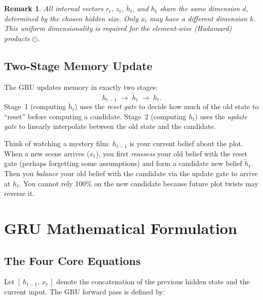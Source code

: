 \documentclass[12pt,a4paper]{article}
\newtheorem{remark}{Remark}[section]
\begin{document}
\begin{remark}
All internal vectors $r_t$, $z_t$, $\tilde{h}_t$, and $h_t$ share the same dimension $d$,
determined by the chosen hidden size. Only $x_t$ may have a different dimension $k$.
This uniform dimensionality is required for the element-wise (Hadamard) products $\odot$.
\end{remark}

\subsection{Two-Stage Memory Update}

The GRU updates memory in exactly two stages:
\begin{equation}
  h_{t-1} \;\longrightarrow\; \tilde{h}_t \;\longrightarrow\; h_t.
  \label{eq:two_stage}
\end{equation}
Stage~1 (computing $\tilde{h}_t$) uses the \emph{reset gate} to decide how much of the old state to
``reset'' before computing a candidate. Stage~2 (computing $h_t$) uses the \emph{update gate} to
linearly interpolate between the old state and the candidate.

\begin{keyinsight}[title=Two-Stage Analogy]
Think of watching a mystery film: $h_{t-1}$ is your current belief about the plot. When a new scene
arrives ($x_t$), you first \emph{reassess} your old belief with the reset gate (perhaps forgetting
some assumptions) and form a candidate new belief $\tilde{h}_t$. Then you \emph{balance} your old
belief with the candidate via the update gate to arrive at $h_t$. You cannot rely 100\% on the
new candidate because future plot twists may reverse it.
\end{keyinsight}

\section{GRU Mathematical Formulation}
\label{sec:gru_math}

\subsection{The Four Core Equations}

Let $[\,h_{t-1},\,x_t\,]$ denote the concatenation of the previous hidden state and the current
input. The GRU forward pass is defined by:
\end{document}
